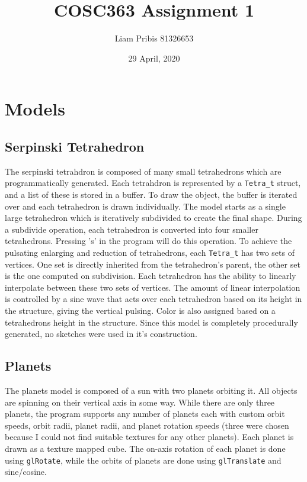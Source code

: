 \documentclass[10pt]{article}
\title{COSC363 Assignment 1}
\author{Liam Pribis 81326653}
\date{29 April, 2020}
\begin{document}
\maketitle
    \section{Models}
    \subsection{Serpinski Tetrahedron}
    
    The serpinski tetrahdron is composed of many small tetrahedrons which are programmatically generated. Each tetrahdron is represented by a \verb|Tetra_t| struct, and a list of these is stored in a buffer. To draw the object, the buffer is iterated over and each tetrahedron is drawn individually. The model starts as a single large tetrahedron which is iteratively subdivided to create the final shape. During a subdivide operation, each tetrahedron is converted into four smaller tetrahedrons. Pressing 's' in the program will do this operation. To achieve the pulsating enlarging and reduction of tetrahedrons, each \verb|Tetra_t| has two sets of vertices. One set is directly inherited from the tetrahedron's parent, the other set is the one computed on subdivision. Each tetrahedron has the ability to linearly interpolate between these two sets of vertices. The amount of linear interpolation is controlled by a sine wave that acts over each tetrahedron based on its height in the structure, giving the vertical pulsing. Color is also assigned based on a tetrahedrons height in the structure. Since this model is completely procedurally generated, no sketches were used in it's construction.

    \subsection{Planets}
    The planets model is composed of a sun with two planets orbiting it. All objects are spinning on their vertical axis in some way. While there are only three planets, the program supports any number of planets each with custom orbit speeds, orbit radii, planet radii, and planet rotation speeds (three were chosen because I could not find suitable textures for any other planets). Each planet is drawn as a texture mapped cube. The on-axis rotation of each planet is done using \verb|glRotate|, while the orbits of planets are done using \verb|glTranslate| and sine/cosine.
\end{document}
